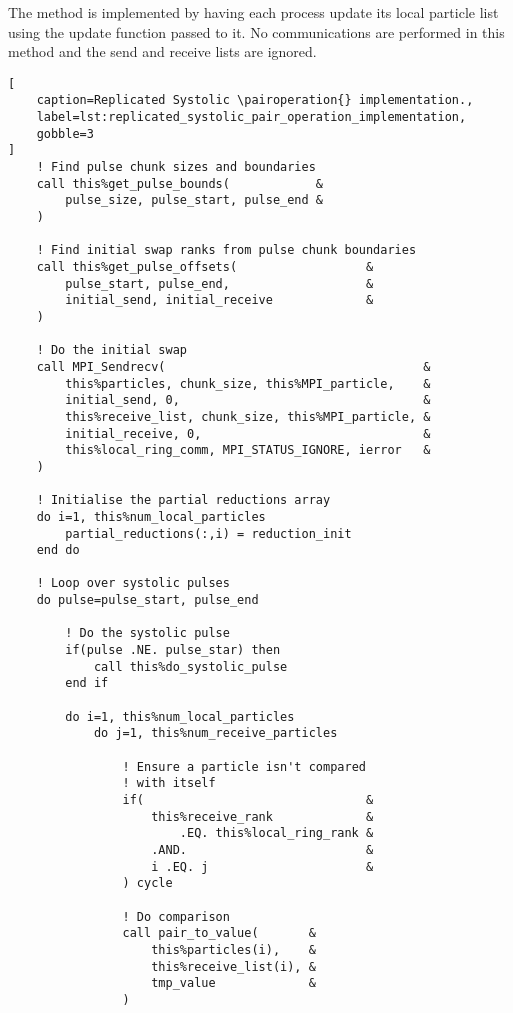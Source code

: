The \individualoperation{} method is implemented by having each process update
its local particle list using the update function passed to it.
%
No communications are performed in this method and the send and receive
lists are ignored.

\begin{lstlisting}[
    caption=Replicated Systolic \pairoperation{} implementation.,
    label=lst:replicated_systolic_pair_operation_implementation,
    gobble=3
]
    ! Find pulse chunk sizes and boundaries
    call this%get_pulse_bounds(            &
        pulse_size, pulse_start, pulse_end &
    )

    ! Find initial swap ranks from pulse chunk boundaries
    call this%get_pulse_offsets(                  &
        pulse_start, pulse_end,                   &
        initial_send, initial_receive             &
    )

    ! Do the initial swap
    call MPI_Sendrecv(                                    &
        this%particles, chunk_size, this%MPI_particle,    &
        initial_send, 0,                                  &
        this%receive_list, chunk_size, this%MPI_particle, &
        initial_receive, 0,                               &
        this%local_ring_comm, MPI_STATUS_IGNORE, ierror   &
    )

    ! Initialise the partial reductions array
    do i=1, this%num_local_particles
        partial_reductions(:,i) = reduction_init
    end do

    ! Loop over systolic pulses
    do pulse=pulse_start, pulse_end

        ! Do the systolic pulse
        if(pulse .NE. pulse_star) then
            call this%do_systolic_pulse
        end if

        do i=1, this%num_local_particles
            do j=1, this%num_receive_particles

                ! Ensure a particle isn't compared
                ! with itself
                if(                               &
                    this%receive_rank             &
                        .EQ. this%local_ring_rank &
                    .AND.                         &
                    i .EQ. j                      &
                ) cycle

                ! Do comparison
                call pair_to_value(       &
                    this%particles(i),    &
                    this%receive_list(i), &
                    tmp_value             &
                )


\end{lstlisting}
